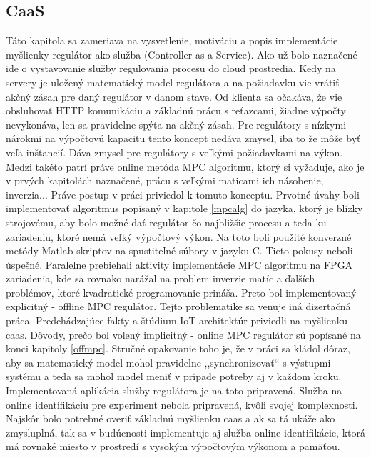 \subsection{CaaS} \label{caas}
Táto kapitola sa zameriava na vysvetlenie, motiváciu a popis implementácie myšlienky regulátor ako služba (Controller as a Service). Ako už bolo naznačené ide o vystavovanie služby regulovania procesu do cloud prostredia. Kedy na servery je uložený matematický model regulátora a na požiadavku vie vrátiť akčný zásah pre daný regulátor v danom stave. Od klienta sa očakáva, že vie obsluhovať HTTP komunikáciu a základnú prácu s reťazcami, žiadne výpočty nevykonáva, len sa pravidelne spýta na akčný zásah. Pre regulátory s nízkymi nárokmi na výpočtovú kapacitu tento koncept nedáva zmysel, iba to že môže byť veľa inštancií. Dáva zmysel pre regulátory s veľkými požiadavkami na výkon. Medzi takéto patrí práve online metóda MPC algoritmu, ktorý si vyžaduje, ako je v prvých kapitolách naznačené, prácu s veľkými maticami ich násobenie, inverzia...  Práve postup v práci priviedol k tomuto konceptu. Prvotné úvahy boli implementovať algoritmus popísaný v kapitole \ref{mpcalg} do jazyka, ktorý je blízky strojovému, aby bolo možné dať regulátor čo najbližšie procesu a teda ku zariadeniu, ktoré nemá veľký výpočtový výkon. Na toto boli použité konverzné metódy Matlab skriptov na spustiteľné súbory v jazyku C. Tieto pokusy neboli úspešné. Paralelne prebiehali aktivity implementácie MPC algoritmu na FPGA zariadenia, kde sa rovnako narážal na problem inverzie matíc a ďalších problémov, ktoré kvadratické programovanie prináša. Preto bol implementovaný explicitný - offline MPC regulátor. Tejto problematike sa venuje iná dizertačná práca. Predchádzajúce fakty a štúdium IoT architektúr priviedli na myšlienku caas. Dôvody, prečo bol volený implicitný - online MPC regulátor sú popísané na konci kapitoly \ref{offmpc}. Stručné opakovanie toho je, že v práci sa kládol dôraz, aby sa matematický model mohol pravidelne ,,synchronizovať`` s výstupmi systému a teda sa mohol model meniť v prípade potreby aj v každom kroku. Implementovaná aplikácia služby regulátora je na toto pripravená. Služba na online identifikáciu pre experiment nebola pripravená, kvôli svojej komplexnosti. Najskôr bolo potrebné overiť základnú myšlienku caas a ak sa tá ukáže ako zmysluplná, tak sa v budúcnosti implementuje aj služba online identifikácie, ktorá má rovnaké miesto v prostredí s vysokým výpočtovým výkonom a pamäťou.
